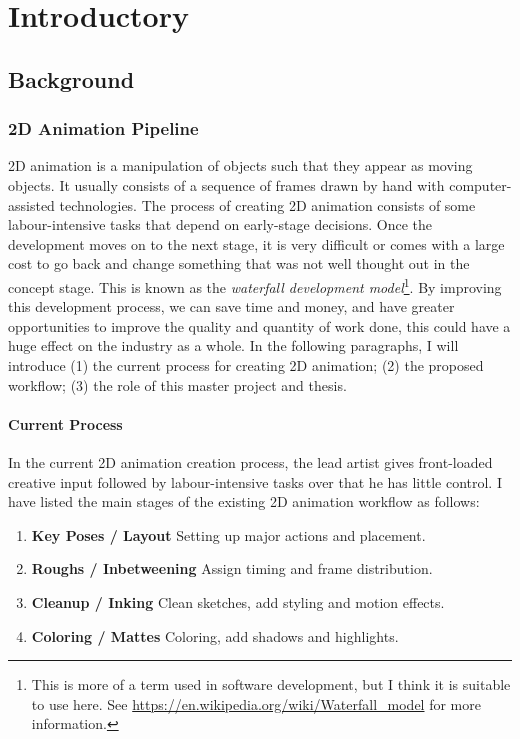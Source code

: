 \chapter{Introductory}
\label{chapterlabel1}
\section{Background}

\subsection{2D Animation Pipeline}
2D animation is a manipulation of objects such that they appear as moving objects. It usually consists of a sequence of frames drawn by hand with computer-assisted technologies. The process of creating 2D animation consists of some labour-intensive tasks that depend on early-stage decisions. Once the development moves on to the next stage, it is very difficult or comes with a large cost to go back and change something that was not well thought out in the concept stage. This is known as the \textit{waterfall development model}\footnote{This is more of a term used in software development, but I think it is suitable to use here. See \url{https://en.wikipedia.org/wiki/Waterfall\_model} for more information.}. By improving this development process, we can save time and money, and have greater opportunities to improve the quality and quantity of work done, this could have a huge effect on the industry as a whole. In the following paragraphs, I will introduce (1) the current process for creating 2D animation;  (2) the proposed workflow; (3) the role of this master project and thesis. 


\subsubsection{Current Process}
In the current 2D animation creation process, the lead artist gives front-loaded creative input followed by labour-intensive tasks over that he has little control. I have listed the main stages of the existing 2D animation workflow as follows:

\begin{enumerate}
    \item \textbf{Key Poses / Layout} Setting up major actions and placement.
    \item \textbf{Roughs / Inbetweening} Assign timing and frame distribution.
    \item \textbf{Cleanup / Inking} Clean sketches, add styling and motion effects.
    \item \textbf{Coloring / Mattes} Coloring, add shadows and highlights.
\end{enumerate}

